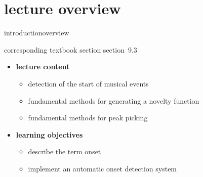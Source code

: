 


\subtitle{Module 9.3: Onset Detection}


	

    \section[overview]{lecture overview}
        \begin{frame}{introduction}{overview}
            \begin{block}{corresponding textbook section}
                    section~9.3
            \end{block}

            \begin{itemize}
                \item   \textbf{lecture content}
                    \begin{itemize}
                        \item   detection of the start of musical events
                        \item   fundamental methods for generating a novelty function
                        \item   fundamental methods for peak picking
                    \end{itemize}
                \bigskip
                \item<2->   \textbf{learning objectives}
                    \begin{itemize}
                        \item   describe the term onset
                        \item   implement an automatic onset detection system
                    \end{itemize}
            \end{itemize}
        \end{frame}

